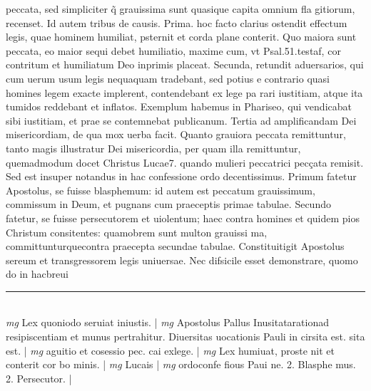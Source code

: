 \documentclass{article}
\begin{document}
\begin{pages}
peccata, sed simpliciter q̃ grauissima sunt quasique  capita omnium fla gitiorum, recenset. Id autem tribus de causis. Prima. hoc facto clarius ostendit effectum legis, quae hominem humiliat, psternit et corda plane conterit. Quo maiora sunt peccata, eo maior sequi debet humiliatio, maxime cum, vt Psal.51.testaf, cor contritum et humiliatum Deo inprimis placeat. Secunda, retundit aduersarios, qui cum uerum usum legis nequaquam tradebant, sed potius e contrario quasi homines legem exacte implerent, contendebant ex lege pa rari iustitiam, atque  ita tumidos reddebant et inflatos. Exemplum habemus in Phariseo, qui vendicabat sibi iustitiam, et prae se contemnebat publicanum. Tertia ad amplificandam Dei misericordiam, de qua mox uerba facit. Quanto grauiora peccata remittuntur, tanto magis illustratur Dei misericordia, per quam illa remittuntur, quemadmodum docet Christus Lucae7. quando mulieri peccatrici pecçata remisit. Sed est insuper notandus in hac confessione ordo decentissimus. Primum fatetur Apostolus, se fuisse blasphemum: id autem est peccatum grauissimum, commissum in Deum, et pugnans cum praeceptis primae tabulae. Secundo fatetur, se fuisse persecutorem et uiolentum; haec contra homines et quidem pios Christum consitentes: quamobrem sunt multon grauissi ma, committunturquecontra praecepta secundae tabulae. Constituitigit Apostolus sereum et transgressorem legis uniuersae. Nec difsicile esset demonstrare, quomo do in hacbreui  \pend
\vspace{0.5cm}\noindent
\vspace{0.2cm}\rule{1cm}{0.2pt}\\ 
\hspace{0.2cm}\textit{mg}
\footnotesize Lex quoniodo seruiat iniustis. 
\normalsize| 
\hspace{0.2cm}\textit{mg}
\footnotesize Apostolus Pallus Inusitatarationad resipiscentiam et munus pertrahitur. Diuersitas uocationis Pauli in cirsita est. sita est. 
\normalsize| 
\hspace{0.2cm}\textit{mg}
\footnotesize aguitio et cosessio pec. cai exlege. 
\normalsize| 
\hspace{0.2cm}\textit{mg}
\footnotesize Lex humiuat, proste nit et conterit cor bo minis. 
\normalsize| 
\hspace{0.2cm}\textit{mg}
\footnotesize Lucais 
\normalsize| 
\hspace{0.2cm}\textit{mg}
\footnotesize ordoconfe fious Paui ne. 2. Blasphe mus. 2. Persecutor. 
\normalsize| 

\end{pages}
\end{document}
